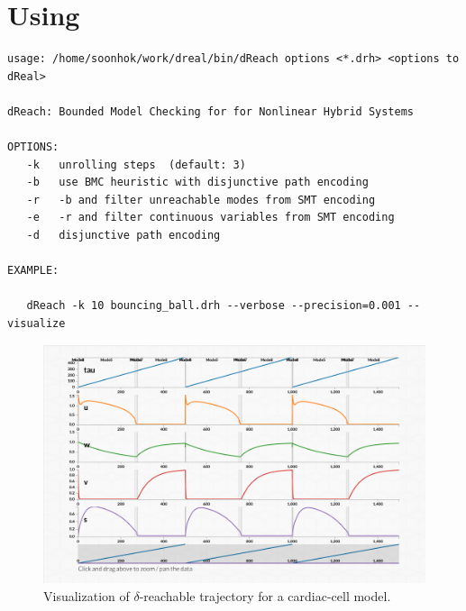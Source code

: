 \section{Using \dReach{}}\label{sec:using-dreach}

  \begin{Verbatim}[fontfamily=courier, frame=single, framesep=1mm, fontsize=\scriptsize]
usage: /home/soonhok/work/dreal/bin/dReach options <*.drh> <options to dReal>

dReach: Bounded Model Checking for for Nonlinear Hybrid Systems

OPTIONS:
   -k   unrolling steps  (default: 3)
   -b   use BMC heuristic with disjunctive path encoding
   -r   -b and filter unreachable modes from SMT encoding
   -e   -r and filter continuous variables from SMT encoding
   -d   disjunctive path encoding

EXAMPLE:

   dReach -k 10 bouncing_ball.drh --verbose --precision=0.001 --visualize

\end{Verbatim}

\begin{figure}
  \centering
  \includegraphics[width=\textwidth]{images/cardiac}
  \caption{Visualization of $\delta$-reachable trajectory for
    a cardiac-cell model.}
  \label{fig:viz}
\end{figure}


